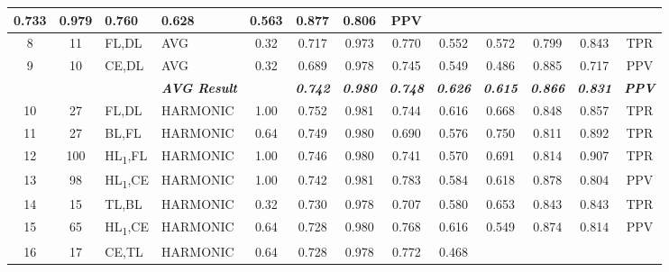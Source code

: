 \begin{table}[H]
{\begin{tabular}{ccl|l|c|c|c|c|c|c|c|c|c|}
    0.733 &
    0.979 &
    0.760 &
    0.628 &
    0.563 &
    0.877 &
    0.806 &
    PPV \\ \hline
  \multicolumn{1}{|c|}{8} &
    \multicolumn{1}{c|}{11} &
    FL,DL &
    AVG &
    0.32 &
    0.717 &
    0.973 &
    0.770 &
    0.552 &
    0.572 &
    0.799 &
    0.843 &
    TPR \\ \hline
  \multicolumn{1}{|c|}{9} &
    \multicolumn{1}{c|}{10} &
    CE,DL &
    AVG &
    0.32 &
    0.689 &
    0.978 &
    0.745 &
    0.549 &
    0.486 &
    0.885 &
    0.717 &
    PPV \\ \hline
   &
    \textit{\textbf{}} &
     &
    \textit{\textbf{AVG Result}} &
     &
    \textit{\textbf{0.742}} &
    \textit{\textbf{0.980}} &
    \textit{\textbf{0.748}} &
    \textit{\textbf{0.626}} &
    \textit{\textbf{0.615}} &
    \textit{\textbf{0.866}} &
    \textit{\textbf{0.831}} &
    \textit{\textbf{PPV}} \\ \hline
  \multicolumn{1}{|c|}{10} &
    \multicolumn{1}{c|}{27} &
    FL,DL &
    HARMONIC &
    1.00 &
    0.752 &
    0.981 &
    0.744 &
    0.616 &
    0.668 &
    0.848 &
    0.857 &
    TPR \\ \hline
  \multicolumn{1}{|c|}{11} &
    \multicolumn{1}{c|}{27} &
    BL,FL &
    HARMONIC &
    0.64 &
    0.749 &
    0.980 &
    0.690 &
    0.576 &
    0.750 &
    0.811 &
    0.892 &
    TPR \\ \hline
  \multicolumn{1}{|c|}{12} &
    \multicolumn{1}{c|}{100} &
    HL\textsubscript{1},FL &
    HARMONIC &
    1.00 &
    0.746 &
    0.980 &
    0.741 &
    0.570 &
    0.691 &
    0.814 &
    0.907 &
    TPR \\ \hline
  \multicolumn{1}{|c|}{13} &
    \multicolumn{1}{c|}{98} &
    HL\textsubscript{1},CE &
    HARMONIC &
    1.00 &
    0.742 &
    0.981 &
    0.783 &
    0.584 &
    0.618 &
    0.878 &
    0.804 &
    PPV \\ \hline
  \multicolumn{1}{|c|}{14} &
    \multicolumn{1}{c|}{15} &
    TL,BL &
    HARMONIC &
    0.32 &
    0.730 &
    0.978 &
    0.707 &
    0.580 &
    0.653 &
    0.843 &
    0.843 &
    TPR \\ \hline
  \multicolumn{1}{|c|}{15} &
    \multicolumn{1}{c|}{65} &
    HL\textsubscript{1},CE &
    HARMONIC &
    0.64 &
    0.728 &
    0.980 &
    0.768 &
    0.616 &
    0.549 &
    0.874 &
    0.814 &
    PPV \\ \hline
  \multicolumn{1}{|c|}{16} &
    \multicolumn{1}{c|}{17} &
    CE,TL &
    HARMONIC &
    0.64 &
    0.728 &
    0.978 &
    0.772 &
    0.468 &

\end{tabular}}
\end{table}
